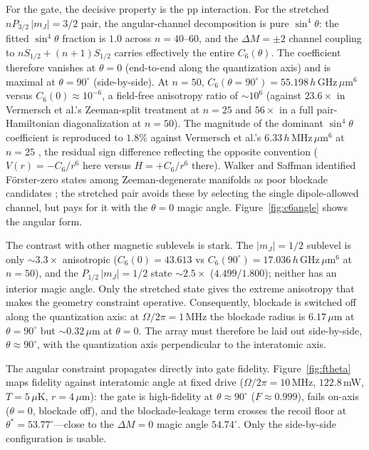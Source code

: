 \documentclass[twocolumn]{article}
\begin{document}
For the gate, the decisive property is the pp interaction. For the stretched $nP_{3/2}\,|m_J|=3/2$ pair, the angular-channel decomposition \cite{Wadenpfuhl2024} is pure $\sin^4\theta$: the fitted $\sin^4\theta$ fraction is $1.0$ across $n=40$--$60$, and the $\Delta M=\pm2$ channel coupling to $nS_{1/2}+(n{+}1)S_{1/2}$ carries effectively the entire $C_6(\theta)$. The coefficient therefore vanishes at $\theta=0$ (end-to-end along the quantization axis) and is maximal at $\theta=90^\circ$ (side-by-side). At $n=50$, $C_6(\theta{=}90^\circ)=55.198\,h\,\mathrm{GHz}\,\mu\mathrm{m}^6$ versus $C_6(0)\approx10^{-6}$, a field-free anisotropy ratio of $\sim10^6$ (against $23.6\times$ in Vermersch et al.'s Zeeman-split treatment at $n=25$ and $56\times$ in a full pair-Hamiltonian diagonalization at $n=50$). The magnitude of the dominant $\sin^4\theta$ coefficient is reproduced to $1.8\%$ against Vermersch et al.'s $6.33\,h\,\mathrm{MHz}\,\mu\mathrm{m}^6$ at $n=25$ \cite{Vermersch2014}, the residual sign difference reflecting the opposite convention ($V(r)=-C_6/r^6$ here versus $H=+C_6/r^6$ there). Walker and Saffman identified F\"orster-zero states among Zeeman-degenerate manifolds as poor blockade candidates \cite{Walker2008}; the stretched pair avoids these by selecting the single dipole-allowed channel, but pays for it with the $\theta=0$ magic angle. Figure~\ref{fig:c6angle} shows the angular form.

The contrast with other magnetic sublevels is stark. The $|m_J|=1/2$ sublevel is only $\sim3.3\times$ anisotropic ($C_6(0)=43.613$ vs $C_6(90^\circ)=17.036\,h\,\mathrm{GHz}\,\mu\mathrm{m}^6$ at $n=50$), and the $P_{1/2}\,|m_J|=1/2$ state $\sim2.5\times$ ($4.499/1.800$); neither has an interior magic angle. Only the stretched state gives the extreme anisotropy that makes the geometry constraint operative. Consequently, blockade is switched off along the quantization axis: at $\Omega/2\pi=1$\,MHz the blockade radius is $6.17\,\mu$m at $\theta=90^\circ$ but $\sim0.32\,\mu$m at $\theta=0$. The array must therefore be laid out side-by-side, $\theta\approx90^\circ$, with the quantization axis perpendicular to the interatomic axis.

The angular constraint propagates directly into gate fidelity. Figure~\ref{fig:ftheta} maps fidelity against interatomic angle at fixed drive ($\Omega/2\pi=10$\,MHz, $122.8$\,mW, $T=5\,\mu$K, $r=4\,\mu$m): the gate is high-fidelity at $\theta\approx90^\circ$ ($F\approx0.999$), fails on-axis ($\theta=0$, blockade off), and the blockade-leakage term crosses the recoil floor at $\theta^{*}=53.77^\circ$---close to the $\Delta M=0$ magic angle $54.74^\circ$. Only the side-by-side configuration is usable.
\end{document}
